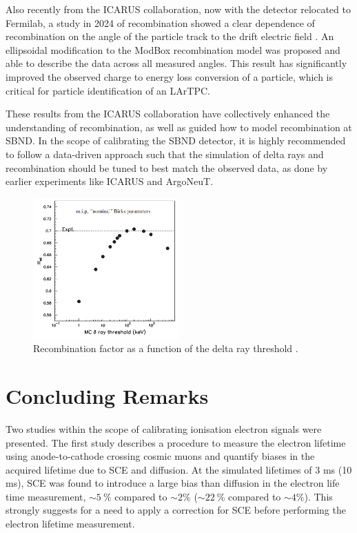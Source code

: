 
Also recently from the ICARUS collaboration, now with the detector relocated to Fermilab, a study in 2024 of recombination showed a clear dependence of recombination on the angle of the particle track to the drift electric field \cite{elipsoid_recomb}.
An ellipsoidal modification to the ModBox recombination model was proposed and able to describe the data across all measured angles. 
This result has significantly improved the observed charge to energy loss conversion of a particle, which is critical for particle identification of an LArTPC.   

These results from the ICARUS collaboration have collectively enhanced the understanding of recombination, as well as guided how to model recombination at SBND.
In the scope of calibrating the SBND detector, it is highly recommended to follow a data-driven approach such that the simulation of delta rays and recombination should be tuned to best match the observed data, as done by earlier experiments like ICARUS and ArgoNeuT.

\begin{figure}[hb!]
\centering 
\includegraphics[width=0.5\textwidth]{icarus_recomb}
\caption[Recombination Factor Against Delta Ray Threshold]{
Recombination factor as a function of the delta ray threshold \cite{icarus_recomb}.
}
\label{fig:icarus_recomb}
\end{figure}

\section{Concluding Remarks}
\label{sec:concludeDeltaRay}

Two studies within the scope of calibrating ionisation electron signals were presented. 
The first study describes a procedure to measure the electron lifetime using anode-to-cathode crossing cosmic muons and quantify biases in the acquired lifetime due to SCE and diffusion. 
At the simulated lifetimes of 3 ms (10 ms), SCE was found to introduce a large bias than diffusion in the electron life time measurement, $\sim5~\%$ compared to $\sim2\%$ ($\sim22~\%$ compared to $\sim4\%$).
This strongly suggests for a need to apply a correction for SCE before performing the electron lifetime measurement. 

